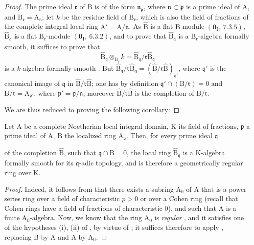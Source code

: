 \begin{proof}
The prime ideal $\mathfrak{r}$ of $\mathrm{B}$ is of the form $\mathfrak{n}_\mathfrak{p}$, where $\mathfrak{n}\subset\mathfrak{p}$ is a prime ideal of $\mathrm{A}$, and $\mathrm{B}_\mathfrak{r}=\mathrm{A}_\mathfrak{n}$; let $k$ be the residue field of $\mathrm{B}_\mathfrak{r}$, which is also the field of fractions of the complete integral local ring $\mathrm{A}'=\mathrm{A}/\mathfrak{n}$.
As $\widehat{\mathrm{B}}$ is a flat $\mathrm{B}$-module $(\mathbf{0}_\mathrm{I},~7.3.5)$, $\widehat{\mathrm{B}}_\mathfrak{q}$ is a flat $\mathrm{B}_\mathfrak{r}$-module $(\mathbf{0}_\mathrm{I},~6.3.2)$, and to prove that $\widehat{\mathrm{B}}_\mathfrak{q}$ is a $\mathrm{B}_\mathfrak{r}$-algebra formally smooth, it suffices to prove that
\[
  \widehat{\mathrm{B}}_\mathfrak{q}\otimes_{\mathrm{B}_\mathfrak{r}}k
  =\widehat{\mathrm{B}}_\mathfrak{q}/\mathfrak{r}\widehat{\mathrm{B}}_\mathfrak{q}
\]
is a $k$-algebra formally smooth .
But $\widehat{\mathrm{B}}_\mathfrak{q}/\mathfrak{r}\widehat{\mathrm{B}}_\mathfrak{q}=(\widehat{\mathrm{B}}/\mathfrak{r}\widehat{\mathrm{B}})_{\mathfrak{q}'}$, where $\mathfrak{q}'$ is the canonical image of $\mathfrak{q}$ in $\widehat{\mathrm{B}}/\mathfrak{r}\widehat{\mathrm{B}}$; one has by definition $\mathfrak{q}'\cap(\mathrm{B}/\mathfrak{r})=0$ and $\mathrm{B}/\mathfrak{r}=\mathrm{A}_{\mathfrak{p}'}$, where $\mathfrak{p}'=\mathfrak{p}/\mathfrak{n}$; moreover $\widehat{\mathrm{B}}/\mathfrak{r}\widehat{\mathrm{B}}$ is the completion of $\mathrm{B}/\mathfrak{r}$.

We are thus reduced to proving the following corollary:
\end{proof}

\begin{corollary}[22.3.4]
\label{0.22.3.4}
Let $\mathrm{A}$ be a complete Noetherian local integral domain, $\mathrm{K}$ its field of fractions, $\mathfrak{p}$ a prime ideal of $\mathrm{A}$, $\mathrm{B}$ the localized ring $\mathrm{A}_\mathfrak{p}$.
Then, for every prime ideal $\mathfrak{q}$


of the completion $\widehat{\mathrm{B}}$, such that $\mathfrak{q}\cap\mathrm{B}=0$, the local ring $\widehat{\mathrm{B}}_\mathfrak{q}$ is a $\mathrm{K}$-algebra formally smooth for its $\mathfrak{q}$-adic topology, and is therefore a geometrically regular ring over $\mathrm{K}$.
\end{corollary}

\begin{proof}
Indeed, it follows from  that there exists a subring $\mathrm{A}_0$ of $\mathrm{A}$ that is a power series ring over a field of characteristic $p>0$ or over a Cohen ring (recall that Cohen rings have a field of fractions of characteristic $0$), and such that $\mathrm{A}$ is a finite $\mathrm{A}_0$-algebra.
Now, we know that the ring $\mathrm{A}_0$ is \emph{regular} , and it satisfies one of the hypotheses (i), (ii) of , by virtue of ; it suffices therefore to apply , replacing $\mathrm{B}$ by $\mathrm{A}$ and $\mathrm{A}$ by $\mathrm{A}_0$.
\end{proof}

